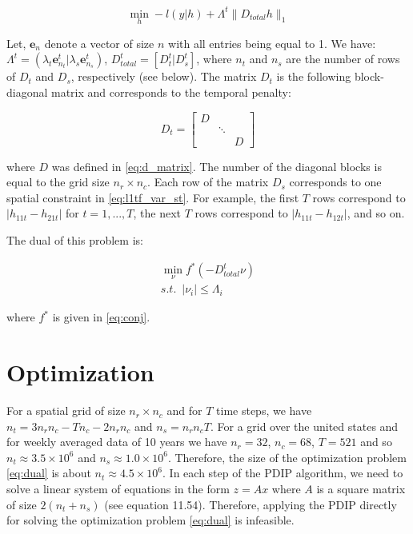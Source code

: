 \documentclass[review]{elsarticle}
\begin{document}
\begin{equation}
\min_h -l(y|h)+ \Lambda^t \lVert D_{total}h \lVert_1
\label{eq:l1tf_var_st_mat}
\end{equation}

Let, $\textbf{e}_n$ denote a vector of size $n$ with all entries being equal to 1. We have: $\Lambda^t=(\lambda_t\textbf{e}_{n_t}^t|\lambda_s\textbf{e}_{n_s}^t)$, $D_{total}^t=[D_{t}^t|D_{s}^t]$, where $n_t$ and $n_s$ are the number of rows of $D_{t}$ and $D_{s}$, respectively (see below). The matrix $D_t$ is the following block-diagonal matrix and corresponds to the temporal penalty:

\begin{equation}
D_t=\begin{bmatrix}
D &  & \\ 
 & \ddots & \\
 &  & D
\end{bmatrix}
\label{eq:d_t_matrix}
\end{equation}

\noindent where $D$ was defined in \ref{eq:d_matrix}. The number of the diagonal blocks is equal to the grid size $n_r \times n_c$. Each row of the matrix $D_s$ corresponds to one spatial constraint in \ref{eq:l1tf_var_st}. For example, the first $T$ rows correspond to $|h_{11t}-h_{21t}|$ for $t=1,...,T$, the next $T$ rows correspond to $|h_{11t}-h_{12t}|$, and so on.

The dual of this problem is:

\begin{equation}
\begin{aligned}
\min_\nu f^*(-D_{total}^t\mathsf{\nu}) \\
s.t. \,\,\, | \nu_i | \le \Lambda_i
\end{aligned}
\label{eq:dual}
\end{equation}

\noindent where $f^*$ is given in \ref{eq:conj}.


\section{Optimization}
For a spatial grid of size $n_r \times n_c$ and for $T$ time steps, we have $n_t=3n_rn_c-Tn_c-2n_rn_c$ and $n_s=n_rn_cT$. For a grid over the united states and for weekly averaged data of 10 years we have $n_r=32$, $n_c=68$, $T=521$ and so $n_t\approx 3.5\times10^6$ and $n_s \approx 1.0\times10^6$. Therefore, the size of the optimization problem \ref{eq:dual} is about $n_t\approx 4.5\times10^6$. In each step of the PDIP algorithm, we need to solve a linear system of equations in the form $z=Ax$ where $A$ is a square matrix of size $2(n_t+n_s)$ (see \cite{boyd_convex_2004} equation 11.54). Therefore, applying the PDIP directly for solving the optimization problem \ref{eq:dual} is infeasible.
\end{document}
